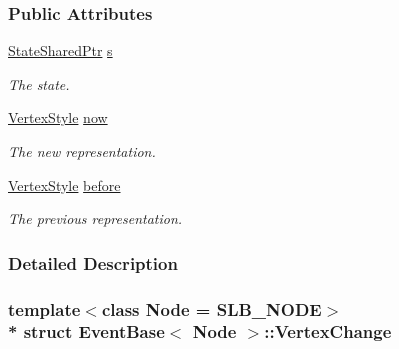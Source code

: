 \subsubsection*{Public Attributes}
\begin{DoxyCompactItemize}
\item 
\hyperlink{structEventBase_a2c0edb5cda08ce1965f3440a97b3fc87}{State\+Shared\+Ptr} \hyperlink{structEventBase_1_1VertexChange_a310773c5d7f23f0a75b48c36705e62df}{s}\hypertarget{structEventBase_1_1VertexChange_a310773c5d7f23f0a75b48c36705e62df}{}\label{structEventBase_1_1VertexChange_a310773c5d7f23f0a75b48c36705e62df}

\begin{DoxyCompactList}\small\item\em The state. \end{DoxyCompactList}\item 
\hyperlink{structVertexStyle}{Vertex\+Style} \hyperlink{structEventBase_1_1VertexChange_a2ca2343803f33a5e540f6d900cc2e903}{now}\hypertarget{structEventBase_1_1VertexChange_a2ca2343803f33a5e540f6d900cc2e903}{}\label{structEventBase_1_1VertexChange_a2ca2343803f33a5e540f6d900cc2e903}

\begin{DoxyCompactList}\small\item\em The new representation. \end{DoxyCompactList}\item 
\hyperlink{structVertexStyle}{Vertex\+Style} \hyperlink{structEventBase_1_1VertexChange_a54a82d80f572f712127c5fd01ec4dd77}{before}\hypertarget{structEventBase_1_1VertexChange_a54a82d80f572f712127c5fd01ec4dd77}{}\label{structEventBase_1_1VertexChange_a54a82d80f572f712127c5fd01ec4dd77}

\begin{DoxyCompactList}\small\item\em The previous representation. \end{DoxyCompactList}\end{DoxyCompactItemize}


\subsubsection{Detailed Description}
\subsubsection*{template$<$class Node = S\+L\+B\+\_\+\+N\+O\+DE$>$\\*
struct Event\+Base$<$ Node $>$\+::\+Vertex\+Change}

